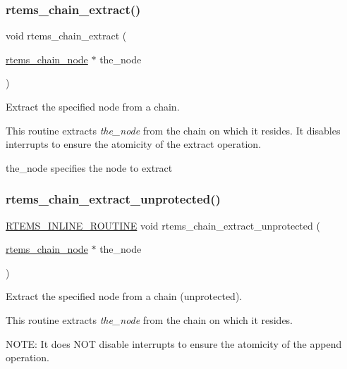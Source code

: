 \subsubsection{\texorpdfstring{rtems\_chain\_extract()}{rtems\_chain\_extract()}}
{\footnotesize\ttfamily void rtems\+\_\+chain\+\_\+extract (\begin{DoxyParamCaption}\item[{\mbox{\hyperlink{structChain__Node__struct}{rtems\+\_\+chain\+\_\+node}} $\ast$}]{the\+\_\+node }\end{DoxyParamCaption})}



Extract the specified node from a chain. 

This routine extracts {\itshape the\+\_\+node} from the chain on which it resides. It disables interrupts to ensure the atomicity of the extract operation.

\begin{DoxyItemize}
\item the\+\_\+node specifies the node to extract \end{DoxyItemize}
\mbox{\label{group__ClassicChains_gaa8062d288572dd93db348803a5229c12}} 
\subsubsection{\texorpdfstring{rtems\_chain\_extract\_unprotected()}{rtems\_chain\_extract\_unprotected()}}
{\footnotesize\ttfamily \mbox{\hyperlink{group__RTEMSScoreBaseDefs_gac216239df231d5dbd15e3520b0b9313f}{R\+T\+E\+M\+S\+\_\+\+I\+N\+L\+I\+N\+E\+\_\+\+R\+O\+U\+T\+I\+NE}} void rtems\+\_\+chain\+\_\+extract\+\_\+unprotected (\begin{DoxyParamCaption}\item[{\mbox{\hyperlink{structChain__Node__struct}{rtems\+\_\+chain\+\_\+node}} $\ast$}]{the\+\_\+node }\end{DoxyParamCaption})}



Extract the specified node from a chain (unprotected). 

This routine extracts {\itshape the\+\_\+node} from the chain on which it resides.

N\+O\+TE\+: It does N\+OT disable interrupts to ensure the atomicity of the append operation. \mbox{\label{group__ClassicChains_ga44b92f7e9e25d9a3a0eadb0b559398cc}} 
